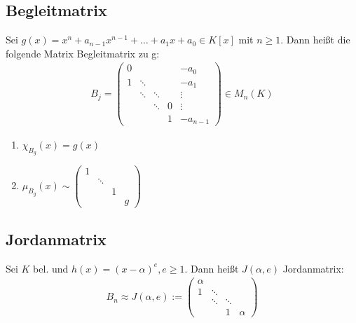 \subsection{Begleitmatrix}
\begin{definition}
Sei $g(x) = x^n + a_{n-1}x^{n-1}+\ldots+a_1x + a_0 \in K[x]$ mit $n \geq 1$. Dann heißt die folgende Matrix Begleitmatrix zu g:
\begin{align*}
B_j =
\begin{pmatrix}
0 &        &		&  & -a_0 \\
1 & \ddots &		&  & -a_1 \\
  & \ddots & \ddots	&  & \vdots \\
  &        & \ddots	& 0 & \vdots \\
  &        &		& 1 & -a_{n-1}
\end{pmatrix}
\in M_n(K)
\end{align*} 
\end{definition}

\begin{remark}
\leavevmode
\begin{enumerate}
	\item $\chi_{B_g}(x) = g(x)$
	\item $\mu_{B_g}(x) \sim 
	\begin{pmatrix}
		1 &        & & \\
		  & \ddots & & \\
		  &        &1& \\
		  &        & & g
	\end{pmatrix}$
\end{enumerate}
\end{remark}


\subsection{Jordanmatrix}
\begin{definition}
Sei $K$ bel. und $h(x)=(x-\alpha)^e, e \geq 1$. Dann heißt $J(\alpha,e)$ Jordanmatrix:
\begin{align*}
B_n \approx J(\alpha,e) :=
\begin{pmatrix}
\alpha &        &   &\\
1      & \ddots &   &\\
       & \ddots & \ddots &\\
       &        & 1 & \alpha
\end{pmatrix}
\end{align*}
\end{definition}

